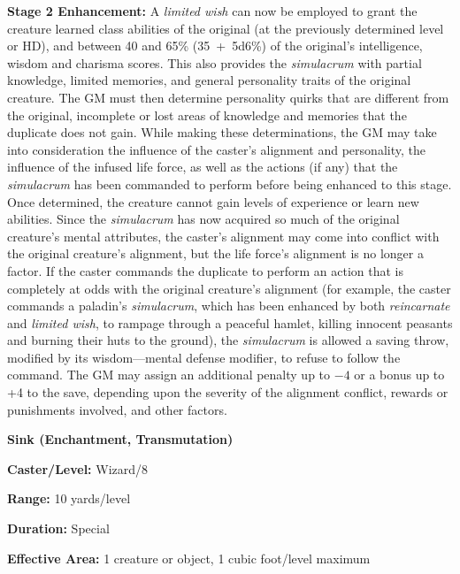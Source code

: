 \begin{multicols}{2}
\textbf{Stage 2 Enhancement:} A \textit{limited wish} can now be employed to grant the creature learned class abilities of the original (at the previously determined level or HD), and between 40 and 65\% (35~+~5d6\%) of the original's intelligence, wisdom and charisma scores.  This also provides the \textit{simulacrum} with partial knowledge, limited memories, and general personality traits of the original creature.  The GM must then determine personality quirks that are different from the original, incomplete or lost areas of knowledge and memories that the duplicate does not gain.  While making these determinations, the GM may take into consideration the influence of the caster's alignment and personality, the influence of the infused life force, as well as the actions (if any) that the \textit{simulacrum} has been commanded to perform before being enhanced to this stage.  Once determined, the creature cannot gain levels of experience or learn new abilities.  Since the \textit{simulacrum} has now acquired so much of the original creature's mental attributes, the caster's alignment may come into conflict with the original creature's alignment, but the life force's alignment is no longer a factor.  If the caster commands the duplicate to perform an action that is completely at odds with the original creature's alignment (for example, the caster commands a paladin's \textit{simulacrum}, which has been enhanced by both \textit{reincarnate} and \textit{limited wish}, to rampage through a peaceful hamlet, killing innocent peasants and burning their huts to the ground), the \textit{simulacrum} is allowed a saving throw, modified by its wisdom---mental defense modifier, to refuse to follow the command.  The GM may assign an additional penalty up to $-4$ or a bonus up to +4 to the save, depending upon the severity of the alignment conflict, rewards or punishments involved, and other factors. 

\vspace{1em}

\noindent
\begin{minipage}{\columnwidth}

\noindent \textbf{Sink (Enchantment, Transmutation)}

\noindent \textbf{Caster/Level:} Wizard/8

\noindent \textbf{Range:} 10 yards/level

\noindent \textbf{Duration:} Special

\noindent \textbf{Effective Area:} 1 creature or object, 1 cubic foot/level maximum


\end{minipage}
\end{multicols}

